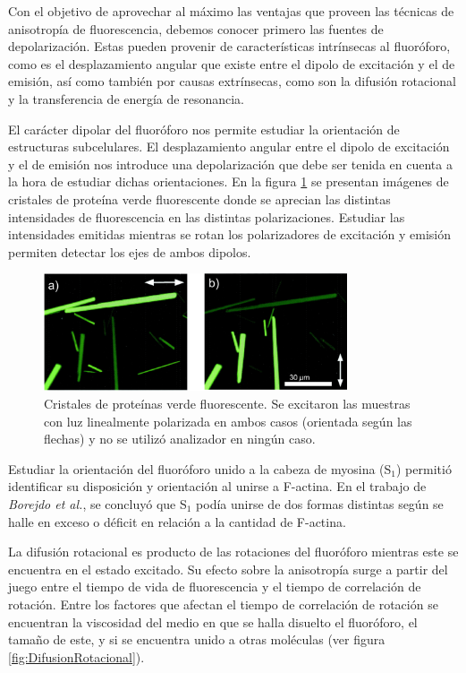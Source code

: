Con el objetivo de aprovechar al máximo las ventajas que proveen las técnicas de anisotropía de fluorescencia, debemos conocer primero las fuentes de depolarización. Estas pueden provenir de características intrínsecas al fluoróforo, como es el desplazamiento angular que existe entre el dipolo de excitación y el de emisión, así como también por causas extrínsecas, como son la difusión rotacional y la transferencia de energía de resonancia\cite{Lakowicz2006}.

El carácter dipolar del fluoróforo nos permite estudiar la orientación de estructuras subcelulares. El desplazamiento angular entre el dipolo de excitación y el de emisión nos introduce una depolarización que debe ser tenida en cuenta a la hora de estudiar dichas orientaciones. En la figura \ref{fig:GFPDipole} se presentan imágenes de cristales de proteína verde fluorescente donde se aprecian las distintas intensidades de fluorescencia en las distintas polarizaciones. Estudiar las intensidades emitidas mientras se rotan los polarizadores de excitación y emisión permiten detectar los ejes de ambos dipolos\cite{Inoue2002}.

\begin{figure}
    \centering
    \includegraphics[width=0.8\textwidth]{./img/GFPDipole.png}
    \caption{Cristales de proteínas verde fluorescente\cite{Inoue2002}. Se excitaron las muestras con luz linealmente polarizada en ambos casos (orientada según las flechas) y no se utilizó analizador en ningún caso.}
    \label{fig:GFPDipole}
\end{figure}

Estudiar la orientación del fluoróforo unido a la cabeza de myosina (S$_1$) permitió identificar su disposición y orientación al unirse a F-actina. En el trabajo de \textit{Borejdo et al.}\cite{Andreev1993}, se concluyó que S$_1$ podía unirse de dos formas distintas según se halle en exceso o déficit en relación a la cantidad de F-actina.

La difusión rotacional es producto de las rotaciones del fluoróforo mientras este se encuentra en el estado excitado. Su efecto sobre la anisotropía surge a partir del juego entre el tiempo de vida de fluorescencia y el tiempo de correlación de rotación. Entre los factores que afectan el tiempo de correlación de rotación se encuentran la viscosidad del medio en que se halla disuelto el fluoróforo, el tamaño de este, y si se encuentra unido a otras moléculas (ver figura \ref{fig:DifusionRotacional}). 

